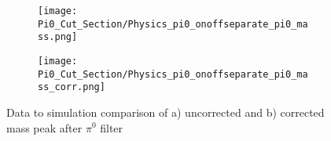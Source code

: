 \begin{figure}[H]
\centering
  \begin{subfigure}[t]{0.3\textwidth}
    \centering
\texttt{[image: Pi0\_Cut\_Section/Physics\_pi0\_onoffseparate\_pi0\_mass.png]}
 \caption{ }
 \end{subfigure} 
 \hspace{30mm}
  \begin{subfigure}[t]{0.3\textwidth}
    \centering
\texttt{[image: Pi0\_Cut\_Section/Physics\_pi0\_onoffseparate\_pi0\_mass\_corr.png]}
  \caption{ }
  \end{subfigure} 
\caption{ Data to simulation comparison of a) uncorrected and b) corrected mass peak after $\pi^0$ filter }
\label{fig:physics_pi0_mass} 
\end{figure}


